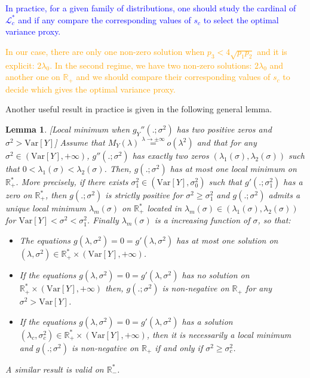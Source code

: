\documentclass[a4paper, 10pt]{article}
\newtheorem{lemma}{Lemma}[section]
\theoremstyle{definition}
\begin{document}
\textcolor{blue}{In practice, for a given family of distributions, one should study the cardinal of $\mathcal{L}_c^*$ and if any compare the corresponding values of $s_c$ to select the optimal variance proxy.}


\textcolor{orange}{In our case, there are only one non-zero solution when $p_3<4\sqrt{p_1p_2}$ and it is explicit: $2\lambda_0$. In the second regime, we have two non-zero solutions: $2\lambda_0$ and another one on $\mathbb{R}_+$ and we should compare their corresponding values of $s_c$ to decide which gives the optimal variance proxy.}

Another useful result in practice is given in the following general lemma. 

\begin{lemma}\label{LemmaNumber}[Local minimum when $g_Y''(.;\sigma^2)$ has two positive zeros and $\sigma^2>\text{Var}[Y]$]
Assume that $M_Y(\lambda)\overset{\lambda\to \pm\infty}{=}o(\lambda^2)$ and that for any $\sigma^2\in \left(\text{Var}[Y],+\infty\right)$, $g''(.;\sigma^2)$ has exactly two zeros $(\lambda_1(\sigma),\lambda_2(\sigma))$ such that $0<\lambda_1(\sigma)<\lambda_2(\sigma)$. Then, $g(.;\sigma^2)$ has at most one local minimum on $\mathbb{R}_+^*$. More precisely, if there exists $\sigma_1^2\in \left(\text{Var}[Y],\sigma_0^2\right)$ such that $g'(.;\sigma_1^2)$ has a zero on $\mathbb{R}_+^*$, then  $g(.;\sigma^2)$ is strictly positive for $\sigma^2\geq\sigma_1^2$ and $g(.;\sigma^2)$ admits a unique local minimum $\lambda_m(\sigma)$ on $\mathbb{R}_+^*$ located in $\lambda_m(\sigma)\in\left(\lambda_1(\sigma),\lambda_2(\sigma)\right)$ for $\text{Var}[Y]<\sigma^2<\sigma_1^2$. Finally $\lambda_m(\sigma)$ is a increasing function of $\sigma$, so that:
\begin{itemize}
    \item The equations $g(\lambda,\sigma^2)=0=g'(\lambda,\sigma^2)$ has at most one solution on $(\lambda,\sigma^2)\in \mathbb{R}_+^*\times \left(\text{Var}[Y],+\infty\right)$.
    \item If the equations $g(\lambda,\sigma^2)=0=g'(\lambda,\sigma^2)$ has no solution on $\mathbb{R}_+^*\times \left(\text{Var}[Y],+\infty\right)$ then, $g(.;\sigma^2)$ is non-negative on $\mathbb{R}_+$ for any $\sigma^2>\text{Var}[Y]$.
    \item If the equations $g(\lambda,\sigma^2)=0=g'(\lambda,\sigma^2)$ has a solution $(\lambda_c,\sigma_c^2)\in \mathbb{R}_+^*\times \left(\text{Var}[Y],+\infty\right)$, then it is necessarily a local minimum and $g(.;\sigma^2)$ is non-negative on $\mathbb{R}_+$ if and only if $\sigma^2\geq \sigma_c^2$. 
\end{itemize}
A similar result is valid on $\mathbb{R}_-^*$. 
\end{lemma}
\end{document}
